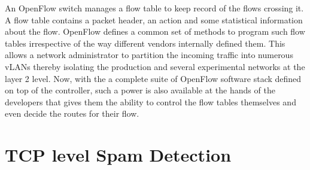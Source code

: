 An OpenFlow switch manages a flow table to keep record of the flows crossing it. A flow table contains a packet header, an action and some statistical information about the flow. OpenFlow defines a common set of methods to program such  flow tables irrespective of the way different vendors internally defined them. This allows a network administrator to partition the incoming traffic into numerous \ac{vLANs} thereby isolating the production and several experimental networks at the layer 2 level. Now, with the a complete suite of OpenFlow software stack defined on top of the controller, such a power is also available at the hands of the developers that gives them the ability to control the flow tables themselves and even decide the routes for their flow.

\section{TCP level Spam Detection}\label{sec:spam-detection}